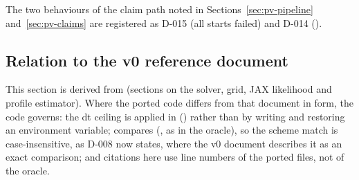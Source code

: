 The two behaviours of the claim path noted in Sections~\ref{sec:pv-pipeline} and~\ref{sec:pv-claims} are registered as D-015 (all starts failed) and D-014 ().

\subsection{Relation to the v0 reference document}\label{sec:pv-v0}

This section is derived from  (sections on the solver, grid, JAX likelihood and
profile estimator). Where the ported code differs from that document in form, the code governs: the dt ceiling
is applied in  () rather than by writing and restoring an environment
variable;  compares  (, as in the oracle),
so the scheme match is case-insensitive, as D-008 now states, where the v0 document describes it as an exact comparison;
and citations here use line numbers of the ported files, not of the oracle.

